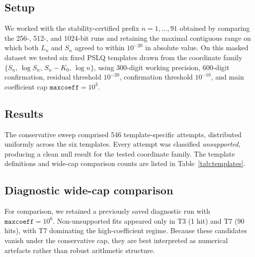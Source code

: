 \documentclass[11pt]{article}
\begin{document}
\subsection{Setup}
We worked with the stability-certified prefix $n=1,\ldots,91$ obtained by comparing the 256-, 512-, and 1024-bit runs and retaining the maximal contiguous range on which both $L_n$ and $S_n$ agreed to within $10^{-20}$ in absolute value. On this masked dataset we tested six fixed PSLQ templates drawn from the coordinate family $\{S_n,\, \log S_n,\, S_n-K_0,\, \log n\}$, using 300-digit working precision, 600-digit confirmation, residual threshold $10^{-20}$, confirmation threshold $10^{-10}$, and main coefficient cap $\texttt{maxcoeff}=10^3$.

\subsection{Results}
The conservative sweep comprised 546 template-specific attempts, distributed uniformly across the six templates. Every attempt was classified \emph{unsupported}, producing a clean null result for the tested coordinate family. The template definitions and wide-cap comparison counts are listed in Table~\ref{tab:templates}.



\subsection{Diagnostic wide-cap comparison}
For comparison, we retained a previously saved diagnostic run with $\texttt{maxcoeff}=10^6$. Non-unsupported fits appeared only in T3 (1 hit) and T7 (90 hits), with T7 dominating the high-coefficient regime. Because these candidates vanish under the conservative cap, they are best interpreted as numerical artefacts rather than robust arithmetic structure.
\end{document}
